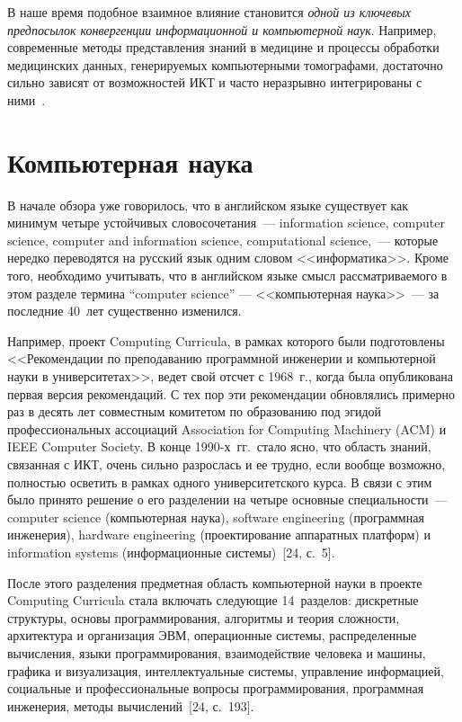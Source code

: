 \begin{multicols}{2}
      В наше время подобное взаимное влияние становится \textit{одной из ключевых
предпосылок конвергенции информационной и компьютерной наук}. Например, современные
методы представления знаний в медицине и процессы обработки медицинских данных,
генерируемых компьютерными томографами, достаточно сильно зависят от возможностей ИКТ
и часто неразрывно интегрированы с ними~\cite{23za}.

\section{Компьютерная наука} %

      В начале обзора уже говорилось, что в анг\-лийском языке существует как минимум
четыре устойчивых словосочетания~--- information science, computer science, computer and
information science,
computational science,~--- которые нередко переводятся на русский язык
одним словом <<информатика>>. Кроме того, необходимо учитывать, что в английском языке
смысл рассматриваемого в этом разделе термина ``computer science'' --- <<компьютерная наука>>~---
за последние 40~лет существенно из\-ме\-нился.


      Например, проект Computing Curricula, в рамках которого были подготовлены
<<Рекомендации по преподаванию программной инженерии и компьютерной науки в
университетах>>, ведет свой отсчет с 1968~г., когда была опубликована первая версия
рекомендаций. С тех пор эти рекомендации обновлялись примерно раз в десять лет совместным
комитетом по образованию под эгидой профессиональных ассоциаций Association for
Computing Machinery (ACM) и IEEE Computer Society. В конце 1990-х~гг.\ стало ясно, что
область знаний, связанная с ИКТ, очень сильно разрослась и ее трудно, если вообще возможно,
полностью осветить в рамках одного университетского курса. В связи с этим было принято
решение о его разделении на четыре основные специальности~--- computer science
(компьютерная наука), software engineering (програм\-мная инженерия), hardware engineering
(проектирование аппаратных платформ) и information systems (информационные
системы)~[24, с.~5].

      После этого разделения предметная область компьютерной науки в проекте Computing
Curricula стала включать следующие 14~разделов: дискретные структуры, основы
программирования, алгоритмы и теория сложности, архитектура и организация ЭВМ,
операционные системы, распределенные вычисления, языки программирования,
взаимодействие человека и машины, графика и визуализация, интеллектуальные системы,
управление информацией, социальные и профессиональные вопросы программирования,
программная инженерия, методы вычислений~[24, с.~193].


\end{multicols}
